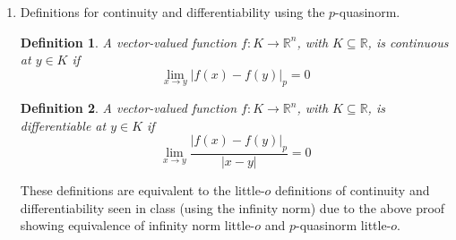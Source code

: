 \documentclass[letterpaper,11pt]{article}
\newtheorem{definition}{Definition}
\newcommand{\R}{\mathbb{R}}
\newcommand{\inv}[1]{\frac{1}{#1}}
\begin{document}
\begin{enumerate}
\begin{proof}
            By the Squeeze Theorem, we conclude that
            \begin{equation*}
                \lim_{x \to y} \frac{|f(x)|_\infty}{|h(x)|} = 0
            \end{equation*}

            Next, we will show the forwards direction: suppose
            $\lim_{x \to y} \frac{|f(x)|_\infty}{|h(x)|} = 0$.

            We have already shown that $|x|_p \leq n^\inv{p} |x|_\infty$, so
            $|f(x)|_p \leq n^\inv{p} |f(x)|_\infty$. Therefore, we have
            \begin{equation*}
                0
                \leq
                \lim_{x \to y} \frac{|f(x)|_p}{|h(x)|}
                \leq
                n^\inv{p} \lim_{x \to y} \frac{|f(x)|_\infty}{|h(x)|} = 0
            \end{equation*}

            Again by the Squeeze Theorem, we conclude that
            \begin{equation*}
                \lim_{x \to y} \frac{|f(x)|_p}{|h(x)|} = 0
            \end{equation*}
        \end{proof}

    \item Definitions for continuity and differentiability using the
        $p$-quasinorm.

        \begin{definition}
            A vector-valued function $f : K \to \R^n$, with $K \subseteq \R$,
            is \emph{continuous} at $y \in K$ if
            \begin{equation*}
                \lim_{x \to y} |f(x) - f(y)|_p = 0
            \end{equation*}
        \end{definition}

        \begin{definition}
            A vector-valued function $f : K \to \R^n$, with $K \subseteq \R$,
            is \emph{differentiable} at $y \in K$ if
            \begin{equation*}
                \lim_{x \to y} \frac{|f(x) - f(y)|_p}{|x - y|} = 0
            \end{equation*}
        \end{definition}

        These definitions are equivalent to the little-$o$ definitions of
        continuity and differentiability seen in class (using the infinity
        norm) due to the above proof showing equivalence of infinity norm
        little-$o$ and $p$-quasinorm little-$o$.


\end{enumerate}
\end{document}
